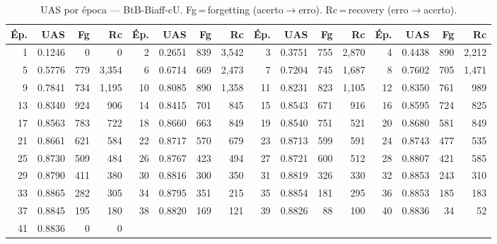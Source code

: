 \begin{table}[ht]
\centering\scriptsize
\caption{UAS por época --- BtB-Biaff-cU. Fg\,=\,forgetting (acerto$\to$erro). Rc\,=\,recovery (erro$\to$acerto).}
\label{tab:uas-predictions-results-bertimbau-base-biaffine}
\begin{tabular}{rrrr rrrr rrrr rrrr}
\toprule
\textbf{Ép.} & \textbf{UAS} & \textbf{Fg} & \textbf{Rc} & \textbf{Ép.} & \textbf{UAS} & \textbf{Fg} & \textbf{Rc} & \textbf{Ép.} & \textbf{UAS} & \textbf{Fg} & \textbf{Rc} & \textbf{Ép.} & \textbf{UAS} & \textbf{Fg} & \textbf{Rc} \\
\midrule
1 & 0.1246 & 0 & 0 & 2 & 0.2651 & 839 & 3,542 & 3 & 0.3751 & 755 & 2,870 & 4 & 0.4438 & 890 & 2,212 \\
5 & 0.5776 & 779 & 3,354 & 6 & 0.6714 & 669 & 2,473 & 7 & 0.7204 & 745 & 1,687 & 8 & 0.7602 & 705 & 1,471 \\
9 & 0.7841 & 734 & 1,195 & 10 & 0.8085 & 890 & 1,358 & 11 & 0.8231 & 823 & 1,105 & 12 & 0.8350 & 761 & 989 \\
13 & 0.8340 & 924 & 906 & 14 & 0.8415 & 701 & 845 & 15 & 0.8543 & 671 & 916 & 16 & 0.8595 & 724 & 825 \\
17 & 0.8563 & 783 & 722 & 18 & 0.8660 & 663 & 849 & 19 & 0.8540 & 751 & 521 & 20 & 0.8680 & 581 & 849 \\
21 & 0.8661 & 621 & 584 & 22 & 0.8717 & 570 & 679 & 23 & 0.8713 & 599 & 591 & 24 & 0.8743 & 477 & 535 \\
25 & 0.8730 & 509 & 484 & 26 & 0.8767 & 423 & 494 & 27 & 0.8721 & 600 & 512 & 28 & 0.8807 & 421 & 585 \\
29 & 0.8790 & 411 & 380 & 30 & 0.8816 & 300 & 350 & 31 & 0.8819 & 326 & 330 & 32 & 0.8853 & 243 & 310 \\
33 & 0.8865 & 282 & 305 & 34 & 0.8795 & 351 & 215 & 35 & 0.8854 & 181 & 295 & 36 & 0.8853 & 185 & 183 \\
37 & 0.8845 & 195 & 180 & 38 & 0.8820 & 169 & 121 & 39 & 0.8826 & 88 & 100 & 40 & 0.8836 & 34 & 52 \\
41 & 0.8836 & 0 & 0 &  & & &  &  & & &  &  & & &  \\
\bottomrule
\end{tabular}
\end{table}

